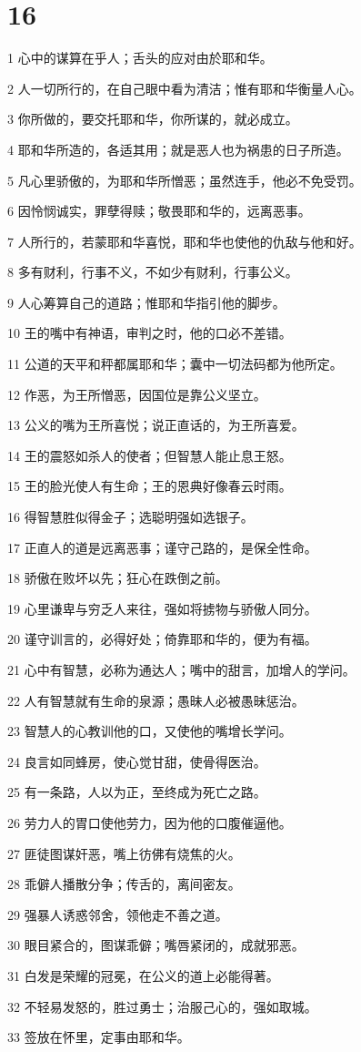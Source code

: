 \chapter{16}

\par 1 心中的谋算在乎人；舌头的应对由於耶和华。
\par 2 人一切所行的，在自己眼中看为清洁；惟有耶和华衡量人心。
\par 3 你所做的，要交托耶和华，你所谋的，就必成立。
\par 4 耶和华所造的，各适其用；就是恶人也为祸患的日子所造。
\par 5 凡心里骄傲的，为耶和华所憎恶；虽然连手，他必不免受罚。
\par 6 因怜悯诚实，罪孽得赎；敬畏耶和华的，远离恶事。
\par 7 人所行的，若蒙耶和华喜悦，耶和华也使他的仇敌与他和好。
\par 8 多有财利，行事不义，不如少有财利，行事公义。
\par 9 人心筹算自己的道路；惟耶和华指引他的脚步。
\par 10 王的嘴中有神语，审判之时，他的口必不差错。
\par 11 公道的天平和秤都属耶和华；囊中一切法码都为他所定。
\par 12 作恶，为王所憎恶，因国位是靠公义坚立。
\par 13 公义的嘴为王所喜悦；说正直话的，为王所喜爱。
\par 14 王的震怒如杀人的使者；但智慧人能止息王怒。
\par 15 王的脸光使人有生命；王的恩典好像春云时雨。
\par 16 得智慧胜似得金子；选聪明强如选银子。
\par 17 正直人的道是远离恶事；谨守己路的，是保全性命。
\par 18 骄傲在败坏以先；狂心在跌倒之前。
\par 19 心里谦卑与穷乏人来往，强如将掳物与骄傲人同分。
\par 20 谨守训言的，必得好处；倚靠耶和华的，便为有福。
\par 21 心中有智慧，必称为通达人；嘴中的甜言，加增人的学问。
\par 22 人有智慧就有生命的泉源；愚昧人必被愚昧惩治。
\par 23 智慧人的心教训他的口，又使他的嘴增长学问。
\par 24 良言如同蜂房，使心觉甘甜，使骨得医治。
\par 25 有一条路，人以为正，至终成为死亡之路。
\par 26 劳力人的胃口使他劳力，因为他的口腹催逼他。
\par 27 匪徒图谋奸恶，嘴上彷佛有烧焦的火。
\par 28 乖僻人播散分争；传舌的，离间密友。
\par 29 强暴人诱惑邻舍，领他走不善之道。
\par 30 眼目紧合的，图谋乖僻；嘴唇紧闭的，成就邪恶。
\par 31 白发是荣耀的冠冕，在公义的道上必能得著。
\par 32 不轻易发怒的，胜过勇士；治服己心的，强如取城。
\par 33 签放在怀里，定事由耶和华。

